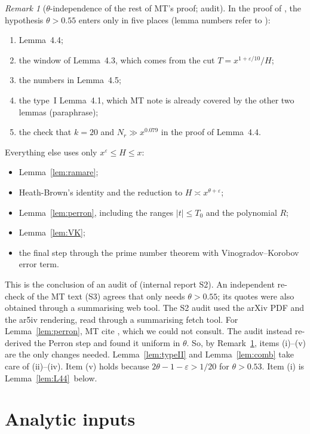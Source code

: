 \documentclass[11pt]{amsart}
\theoremstyle{definition}
\theoremstyle{remark}
\newtheorem{remark}[theorem]{Remark}
\newcommand{\e}{\varepsilon}
\newcommand{\Lfp}{Lemma~\ref{lem:L44}}
\begin{document}
\begin{remark}[$\theta$-independence of the rest of MT's proof; audit]\label{prop:indep}
In the proof of \cite[Theorem~1.1]{MT}, the hypothesis $\theta>0.55$ enters only in five places (lemma numbers refer to \cite{MT}):
\begin{enumerate}[label=(\roman*),leftmargin=*]
\item Lemma~4.4;
\item the window of Lemma~4.3, which comes from the cut $T=x^{1+\e/10}/H$;
\item the numbers in Lemma~4.5;
\item the type~I Lemma~4.1, which MT note is already covered by the other two lemmas (paraphrase);
\item the check that $k=20$ and $N_r\gg x^{0.079}$ in the proof of Lemma~4.4.
\end{enumerate}
Everything else uses only $x^{\e}\le H\le x$:
\begin{itemize}[leftmargin=*]
\item Lemma~\ref{lem:ramare};
\item Heath-Brown's identity and the reduction to $H\asymp x^{\theta+\e}$;
\item Lemma~\ref{lem:perron}, including the ranges $|t|\le T_0$ and the polynomial $R$;
\item Lemma~\ref{lem:VK};
\item the final step through the prime number theorem with Vinogradov--Korobov error term.
\end{itemize}
\end{remark}

This is the conclusion of an audit of \cite{MT} (internal report S2). An independent re-check of the MT text (S3) agrees that only
\cite[Lemma~4.4]{MT} needs $\theta>0.55$; its quotes were also obtained through a summarising web tool. The S2 audit used the arXiv PDF and the ar5iv rendering,
read through a summarising fetch tool. For Lemma~\ref{lem:perron}, MT cite \cite[Lemma~7.2]{Ha}, which we could not consult. The audit
instead re-derived the Perron step and found it uniform in $\theta$. So, by Remark~\ref{prop:indep}, items (i)--(v) are the only
changes needed. Lemma~\ref{lem:typeII} and Lemma~\ref{lem:comb} take care of (ii)--(iv). Item (v) holds because $2\theta-1-\e>1/20$ for
$\theta>0.53$. Item (i) is \Lfp\ below.

\section{Analytic inputs}\label{sec:inputs}
\end{document}
